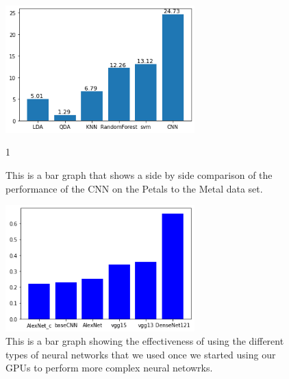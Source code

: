 \documentclass{article}
\begin{document}
\begin{figure}
  \centering
  \includegraphics[width=0.65\textwidth]{FlowerPlot1.png}
  \caption{This is a bar graph that shows a side by side comparison of the performance of the CNN on the Petals to the Metal data set.}
  \label{fig:FlowerPlot1}1
\end{figure}

\begin{multicols}{2}

\end{multicols}

\begin{figure}
  \centering
  \includegraphics[width=0.65\textwidth]{FlowerPlot2.png}
  \caption{This is a bar graph showing the effectiveness of using the different types of neural networks that we used once we started using our GPUs to perform more complex neural netowrks.}
  \label{fig:FlowerPlot2}
\end{figure} 
\end{document}
